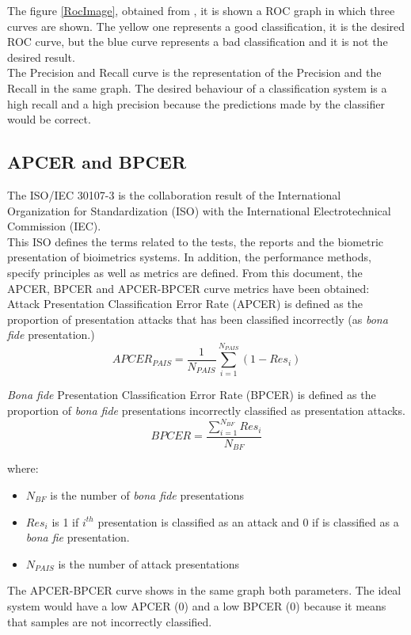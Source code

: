 The figure \ref{RocImage}, obtained from \cite{RocImage}, it is shown a ROC graph in which three curves are shown.  The yellow one represents a good classification, it is the desired ROC curve, but the blue curve represents a bad classification and it is not the desired result.\\

The Precision and Recall curve is the representation of the Precision and the Recall in the same graph. The desired behaviour of a classification system is a high recall and a high precision because the predictions made by the classifier would be correct.\\

\subsection{APCER and BPCER}
The ISO/IEC 30107-3 \cite{ISO} is the collaboration result of  the International Organization for Standardization (ISO) with the International Electrotechnical Commission (IEC).\\

This ISO defines the terms related to the tests, the reports and the biometric presentation of bioimetrics systems. In addition, the performance methods, specify principles as well as metrics are defined. From this document, the APCER, BPCER and APCER-BPCER curve metrics have been obtained:\\

Attack Presentation Classification Error Rate (APCER) is defined as the proportion of presentation attacks that has been classified incorrectly (as \textit{bona fide} presentation.)\\

\begin{equation}
  APCER_{PAIS} = \frac{1}{N_{PAIS}}\sum_{i=1}^{N_{PAIS}}(1 - Res_{i})
\end{equation}

\textit{Bona fide} Presentation Classification Error Rate (BPCER) is defined as the proportion of \textit{bona fide} presentations  incorrectly classified as presentation attacks.\\

\begin{equation}
  BPCER = \frac{\sum_{i=1}^{N_{BF}}Res_{i}}{N_{BF}}
\end{equation}

where: \begin{itemize}
\item $N_{BF}$ is the number of \textit{bona fide} presentations
\item $Res_{i}$ is 1 if $i^{th}$ presentation is classified as an attack and 0 if is classified as a \textit{bona fie} presentation.
\item $N_{PAIS}$ is the number of attack presentations
\end{itemize}

The APCER-BPCER curve shows in the same graph both parameters. The ideal system would have a low APCER (0) and a low BPCER (0) because it means that samples are not incorrectly classified.\\ 
